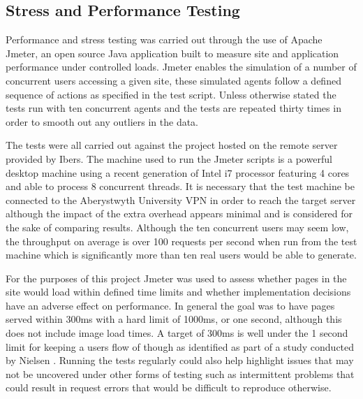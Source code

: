 \subsection{Stress and Performance Testing}

Performance and stress testing was carried out through the use of Apache Jmeter\cite{_jmeter}, an open source Java application built to measure site and application performance under controlled loads. Jmeter enables the simulation of a number of concurrent users accessing a given site, these simulated agents follow a defined sequence of actions as specified in the test script. Unless otherwise stated the tests run with ten concurrent agents and the tests are repeated thirty times in order to smooth out any outliers in the data.

The tests were all carried out against the project hosted on the remote server provided by Ibers. The machine used to run the Jmeter scripts is a powerful desktop machine using a recent generation of Intel i7 processor featuring 4 cores and able to process 8 concurrent threads. It is necessary that the test machine be connected to the Aberystwyth University VPN in order to reach the target server although the impact of the extra overhead appears minimal and is considered for the sake of comparing results. Although the ten concurrent users may seem low, the throughput on average is over 100 requests per second when run from the test machine which is significantly more than ten real users would be able to generate.

For the purposes of this project Jmeter was used to assess whether pages in the site would load within defined time limits and whether implementation decisions have an adverse effect on performance. In general the goal was to have pages served within 300ms with a hard limit of 1000ms, or one second, although this does not include image load times. A target of 300ms is well under the 1 second limit for keeping a users flow of though as identified as part of a study conducted by Nielsen \cite{responseTimes}. Running the tests regularly could also help highlight issues that may not be uncovered under other forms of testing such as intermittent problems that could result in request errors that would be difficult to reproduce otherwise.


